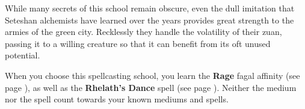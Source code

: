     While many secrets of this school remain obscure, even the dull imitation that Seteshan alchemists have learned over the years provides great strength to the armies of the green city.
    Recklessly they handle the volatility of their zuan, passing it to a willing creature so that it can benefit from its oft unused potential.

    When you choose this spellcasting school, you learn the \textbf{Rage} fagal affinity (see page \pageref{medium::rage}), as well as the \textbf{Rhelath's Dance} spell (see page \pageref{spell::rhelathsdance}).
    Neither the medium nor the spell count towards your known mediums and spells.




\newpage

